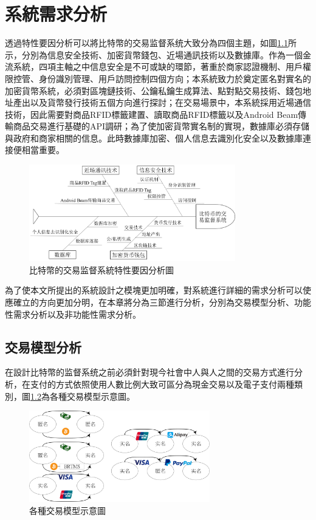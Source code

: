 \chapter{系統需求分析}

透過特性要因分析可以將比特幣的交易监督系统大致分為四個主題，如圖\ref{fish1}所示，分別為信息安全技術、加密貨幣錢包、近場通訊技術以及數據庫。作為⼀個⾦流系統，四項主軸之中信息安全是不可或缺的環節，著重於商家認證機制、用戶權限控管、身份識別管理、用戶訪問控制四個方向；本系統致力於奠定匿名對實名的加密貨幣系統，必須對區塊鏈技術、公鑰私鑰生成算法、點對點交易技術、錢包地址產出以及貨幣發行技術五個方向進行探討；在交易場景中，本系統採用近場通信技術，因此需要對商品RFID標籤建置、讀取商品RFID標籤以及Android Beam傳輸商品交易進行基礎的API調研；為了使加密貨幣實名制的實現，數據庫必須存儲與政府和商家相關的信息。此時數據庫加密、個人信息去識別化安全以及數據庫連接便相當重要。
		\begin{figure}[!htbp]
			\centering
			\includegraphics[width = 0.8\textwidth]{fish1.png}
			\caption{⽐特幣的交易监督系統特性要因分析圖}\label{fish1}
		\end{figure}

為了使本⽂所提出的系統設計之模塊更加明確，對系統進⾏詳細的需求分析可以使應確⽴的⽅向更加分明，在本章將分為三節進行分析，分別為交易模型分析、功能性需求分析以及非功能性需求分析。


\section{交易模型分析}

在設計比特幣的监督系统之前必須針對現今社會中人與人之間的交易方式進行分析，在支付的方式依照使用人數比例大致可區分為現金交易以及電子支付兩種類別，圖\ref{modeall}為各種交易模型示意圖。
\begin{figure}[!htbp]
	\centering
	\includegraphics[width = 0.7\textwidth]{modeall.png}
	\caption{各種交易模型示意圖}\label{modeall}
\end{figure}

